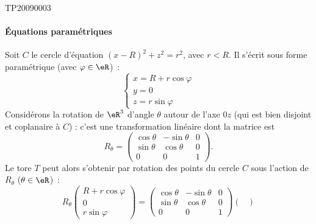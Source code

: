 
\begin{corrige}{TP20090003}




\paragraph{Équations paramétriques}
Soit $C$ le cercle d'équation $(x-R)^2 + z^2 = r^2$, avec $r < R$. Il
s'écrit sous forme paramétrique (avec $\varphi \in \eR$)~:
\begin{equation*}
  \begin{cases}
    x = R + r\cos \varphi\\
    y = 0\\
    z = r \sin \varphi
  \end{cases}
\end{equation*}
Considérons la rotation de $\eR^3$ d'angle $\theta$ autour de l'axe
$0z$ (qui est bien disjoint et coplanaire à $C$) : c'est une
transformation linéaire dont la matrice est
\begin{equation*}
  R_\theta =
  \begin{pmatrix}
    \cos \theta & -\sin \theta & 0\\
    \sin \theta & \cos \theta & 0\\
    0 & 0 & 1
  \end{pmatrix}.
\end{equation*}
Le tore $T$ peut alors s'obtenir par rotation des points du cercle $C$ sous
l'action de $R_\theta$ ($\theta \in \eR$)~:
\begin{equation*}
  R_\theta%
  \begin{pmatrix}
    R + r\cos \varphi\\
    0\\
    r \sin \varphi
  \end{pmatrix}
  =
  \begin{pmatrix}
    \cos \theta & -\sin \theta & 0\\
    \sin \theta & \cos \theta & 0\\
    0 & 0 & 1
  \end{pmatrix}
  \begin{pmatrix}

\end{pmatrix}
\end{equation*}
\end{corrige}
